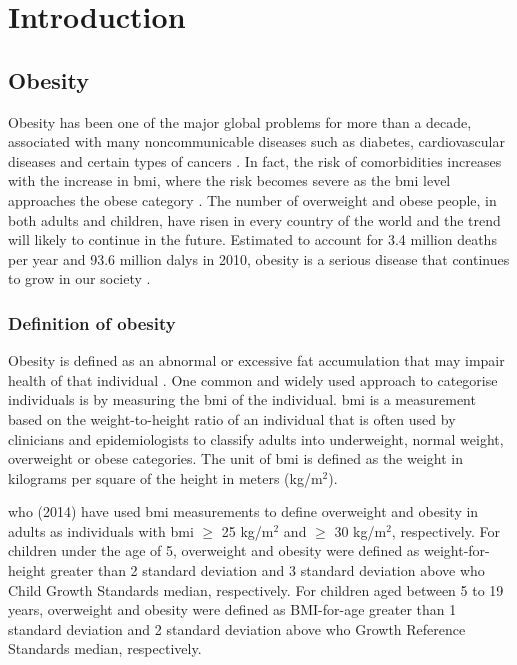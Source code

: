 \chapter{Introduction}
\label{ch:intro}

\section{Obesity}
\label{sec:obesity}

Obesity has been one of the major global problems for more than a decade, associated with many noncommunicable diseases such as diabetes, cardiovascular diseases and certain types of cancers \citep{WHO2014}.
In fact, the risk of comorbidities increases with the increase in \gls{bmi}, where the risk becomes severe as the \gls{bmi} level approaches the obese category \citep{WHO2000}.
The number of overweight and obese people, in both adults and children, have risen in every country of the world and the trend will likely to continue in the future.
Estimated to account for 3.4 million deaths per year and 93.6 million \glspl{daly} in 2010, obesity is a serious disease that continues to grow in our society \citep{Lim2012}.

\subsection{Definition of obesity}
\label{sub:definition_of_obesity}

Obesity is defined as an abnormal or excessive fat accumulation that may impair health of that individual \citep{Garrow1988}.
One common and widely used approach to categorise individuals is by measuring the \gls{bmi} of the individual.
\gls{bmi} is a measurement based on the weight-to-height ratio of an individual that is often used by clinicians and epidemiologists to classify adults into underweight, normal weight, overweight or obese categories.
The unit of \gls{bmi} is defined as the weight in kilograms per square of the height in meters (kg/m$^2$).

\gls{who} (2014) have used \gls{bmi} measurements to define overweight and obesity in adults as individuals with \gls{bmi} $\geq$ 25 kg/m$^2$ and $\geq$ 30 kg/m$^2$, respectively.
For children under the age of 5, overweight and obesity were defined as weight-for-height greater than 2 standard deviation and 3 standard deviation above \gls{who} Child Growth Standards median, respectively.
For children aged between 5 to 19 years, overweight and obesity were defined as BMI-for-age greater than 1 standard deviation and 2 standard deviation above \gls{who} Growth Reference Standards median, respectively.


